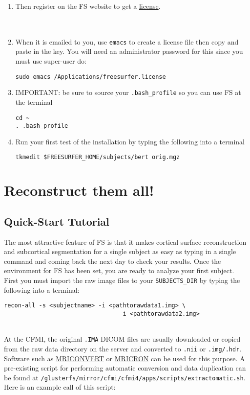 \documentclass[paper=a4, fontsize=11pt]{scrartcl} %
\numberwithin{equation}{section} %
\numberwithin{figure}{section} %
\numberwithin{table}{section} %
\begin{document}
\begin{enumerate}
\item Then register on the FS website to get a \href{https://surfer.nmr.mgh.harvard.edu/registration.html}{license}.
\\~ \\~
\item When it is emailed to you, use \texttt{emacs} to create a license file then copy and paste in the key. You will need an administrator password for this since you must use super-user do:
\begin{lstlisting}[frame=single]
sudo emacs /Applications/freesurfer.license
\end{lstlisting}  

\item IMPORTANT: be sure to source your \texttt{.bash\_profile} so you can use FS at the terminal
\begin{lstlisting}[frame=single]
cd ~
. .bash_profile
\end{lstlisting}
\item Run your first test of the installation by typing the following into a terminal
\begin{lstlisting}[frame=single]
tkmedit $FREESURFER_HOME/subjects/bert orig.mgz
\end{lstlisting}
\end{enumerate}

\section{Reconstruct them all!}
\subsection{Quick-Start Tutorial} The most attractive feature of  FS is that it makes cortical surface reconstruction and subcortical segmentation for a single subject as easy as typing in a single command and coming back the next day to check your results.  Once the environment for FS has been set, you are ready to analyze your first subject.  First you must import the raw image files to your \texttt{SUBJECTS\_DIR} by typing the following into a terminal:
\begin{lstlisting}[frame=single, xrightmargin=0cm]
recon-all -s <subjectname> -i <pathtorawdata1.img> \
			                     -i <pathtorawdata2.img>
\end{lstlisting}

~\\
At the CFMI, the original \texttt{.IMA} DICOM files are usually downloaded or copied from the raw data directory on the server and converted to \texttt{.nii} or \texttt{.img/.hdr}.  Software such as \href{http://neuro.debian.net/pkgs/mriconvert.html}{MRICONVERT} or \href{http://www.mccauslandcenter.sc.edu/mricro/mricron/}{MRICRON} can be used for this purpose.  A pre-existing script for performing automatic conversion and data duplication can be found at \texttt{/glusterfs/mirror/cfmi/cfmi4/apps/scripts/extractomatic.sh}.   Here is an example call of this script:
\end{document}

